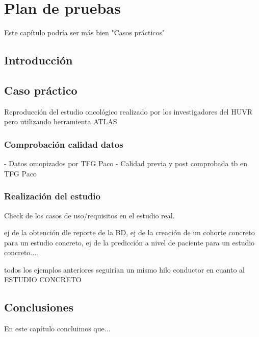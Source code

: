 \chapter{Plan de pruebas}\label{cap:08pruebas}

Este capítulo podría ser más bien "Casos prácticos"

\section{Introducción}

\section{Caso práctico}

Reproducción del estudio oncológico realizado por los investigadores del HUVR pero utilizando herramienta ATLAS


\subsection{Comprobación calidad datos}

- Datos omopizados por TFG Paco 
- Calidad previa y post comprobada tb en TFG Paco

\subsection{Realización del estudio}

Check de los casos de uso/requisitos en el estudio real.

ej de la obtención dle reporte de la BD,
ej de la creación de un cohorte concreto para un estudio concreto,
ej de la predicción a nivel de paciente para un estudio concreto....

todos los ejemplos anteriores seguirían un mismo hilo conductor en cuanto al ESTUDIO CONCRETO

\section{Conclusiones}

En este capítulo concluimos que...